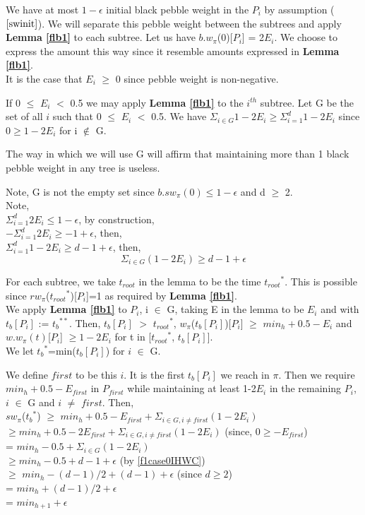 \documentclass[12pt]{article}
\newcommand{\troot}{t_{root}}
\newcommand{\troots}{{t_{root}}^*}
\newcommand{\tbss}{{t_b}^{**}}
\newcommand{\tbs}{{t_b}^{*}}
\newcommand{\tbith}{t_b[{P_i}]}
\begin{document}
We have at most $1 - \epsilon$ initial black pebble weight in the $P_i$ by assumption ($\ref{swinit}$). We will separate this pebble weight between the subtrees and apply {\bf Lemma \ref{flb1}} to each subtree. Let us have $b.w_{\pi}$(0)[$P_i$] = 2$E_i$. We choose to express the amount this way since it resemble amounts expressed in {\bf Lemma \ref{flb1}}.\\

It is the case that $E_i$ $\geq$ 0 since pebble weight is non-negative.

If 0 ${\leq}$ $E_i$ ${<}$ 0.5 we may apply {\bf Lemma \ref{flb1}} to the $i^{th}$ subtree. Let G be the set of all $i$ such that 0 ${\leq}$ $E_i$ ${<}$ 0.5. We have $\Sigma_{i \in G} 1 - 2E_i \geq \Sigma_{i=1}^d 1- 2E_i$ since $0 \geq 1 - 2E_i$ for i $\notin$ G. 

The way in which we will use G will affirm that maintaining more than 1 black pebble weight in any tree is useless.

Note, G is not the empty set since $b.sw_{\pi}(0) \leq 1-\epsilon$ and d $\geq$ 2.\\

\noindent 
Note,\\
$\Sigma_{i=1}^d 2E_i \leq 1-\epsilon$, by construction,\\
$- \Sigma_{i=1}^d 2E_i  \geq - 1 + \epsilon$, then,\\
$\Sigma_{i=1}^d 1 - 2E_i  \geq d - 1 + \epsilon$, then,\\
\begin{equation}\Sigma_{i \in G} (1 - 2E_i) \geq d - 1 + \epsilon \label{f1case0IHWC}\end{equation}

For each subtree, we take $\troot$ in the lemma to be the time $\troots$. This is possible since $rw_\pi$($\troots$)[$P_i$]=1 as required by {\bf Lemma \ref{flb1}}.\\

We apply {\bf Lemma \ref{flb1}} to $P_i$, i $\in$ G,  taking E in the lemma to be ${E_i}$ and with $\tbith$ := $\tbss$. Then, $\tbith $ $>$ $\troots$, $w_{\pi}$($\tbith$)[$P_i$] $\geq$ $min_h+0.5-E_i$ and $w.w_\pi(t)$[$P_i$] $\geq 1-2E_i$ for t in [$\troots$, $\tbith$]. \\

We let $\tbs$=min($\tbith$) for $i$ $\in$ G.

We define $first$ to be this $i$. It is the first $\tbith$ we reach in $\pi$. Then we require $min_h+0.5-E_{first}$ in $P_{first}$ while maintaining at least 1-2$E_i$ in the remaining $P_i$, $i$ $\in$ G and $i$ $\ne$ $first$. Then,\\
$sw_{\pi}$($\tbs$) $\geq$ $min_h+0.5-E_{first}+\Sigma_{i \in G, i \ne first} (1-2E_i)$\\
$\geq min_h+0.5-2E_{first}+\Sigma_{i \in G, i \ne first} (1-2E_i)$  (since, $0 \geq -E_{first}$)\\
= $min_h-0.5+\Sigma_{i \in G} (1-2E_i)$\\
$\geq min_h-0.5+d-1+\epsilon$ (by \ref{f1case0IHWC})\\
$\geq$ $min_h-(d-1)/2+(d-1)+\epsilon$ (since $d \geq 2$)\\
= $min_h+(d-1)/2+\epsilon$\\
= $min_{h+1}+\epsilon$
\end{document}
